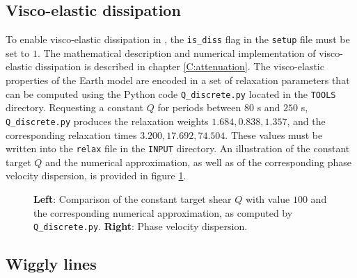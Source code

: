 \subsection{Visco-elastic dissipation}\label{S:NAQ}

To enable visco-elastic dissipation in \SES, the \texttt{is\_diss} flag in the \texttt{setup} file must be set to $1$. The mathematical description and numerical implementation of visco-elastic dissipation is described in chapter \ref{C:attenuation}. The visco-elastic properties of the Earth model are encoded in a set of relaxation parameters that can be computed using the Python code \texttt{Q\_discrete.py} located in the \texttt{TOOLS} directory. Requesting a constant $Q$ for periods between $80$ s and $250$ s, \texttt{Q\_discrete.py} produces the relaxation weights $1.684, 0.838, 1.357$, and the corresponding relaxation times $3.200, 17.692, 74.504$. These values must be written into the \texttt{relax} file in the \texttt{INPUT} directory. An illustration of the constant target $Q$ and the numerical approximation, as well as of the corresponding phase velocity dispersion, is provided in figure \ref{F:Q_NA}.
\begin{center}
\begin{figure}
\center{} 
\caption{\textbf{Left}: Comparison of the constant target shear $Q$ with value $100$ and the corresponding numerical approximation, as computed by \texttt{Q\_discrete.py}. \textbf{Right}: Phase velocity dispersion.}\label{F:Q_NA}
\end{figure}
\end{center}


\subsection{Wiggly lines}\label{S:NA_seismo}

